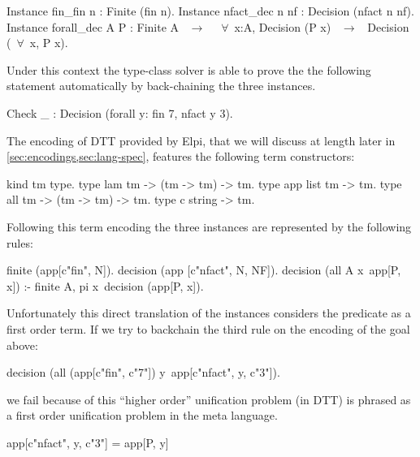\documentclass[sigconf,natbib=false]{acmart}
\begin{document}
\begin{coqcode}
Instance fin_fin n : Finite (fin n).
Instance nfact_dec n nf : Decision (nfact n nf).
Instance forall_dec A P : Finite A ~$\to$~ 
  ~$\forall$~x:A, Decision (P x) ~$\to$~ Decision (~$\forall$~x, P x).
\end{coqcode}

\noindent Under this context the type-class solver is able to prove
the the following statement automatically by back-chaining
the three instances.

\begin{coqcode}
  Check _ : Decision (forall y: fin 7, nfact y 3).
\end{coqcode}

\noindent
The encoding of DTT provided by Elpi, that we will discuss at length later in
\cref{sec:encodings,sec:lang-spec}, features the following term constructors:

\begin{elpicode}
kind tm type.
type lam tm -> (tm -> tm) -> tm. %
type app list tm -> tm.          %
type all tm -> (tm -> tm) -> tm. %
type c string -> tm.             %
\end{elpicode}

\noindent
{}
Following this term encoding the three instances are represented by the
following rules:

\begin{elpicode}
finite (app[c"fin", N]).
decision (app [c"nfact", N, NF]).
decision (all A x\ app[P, x]) :- finite A,
  pi x\ decision (app[P, x]).
\end{elpicode}

\noindent
{}
Unfortunately this direct translation of the instances considers the
predicate  as a first order term. If we try to backchain the
third rule on the encoding of the goal above:
  
\begin{elpicode}
decision (all (app[c"fin", c"7"]) y\
  app[c"nfact", y, c"3"]).
\end{elpicode}

\noindent
we fail because of this ``higher order'' unification problem (in DTT)
is phrased as a first order unification problem in the meta language.

\begin{elpicode}
app[c"nfact", y, c"3"] = app[P, y]
\end{elpicode}
\end{document}
